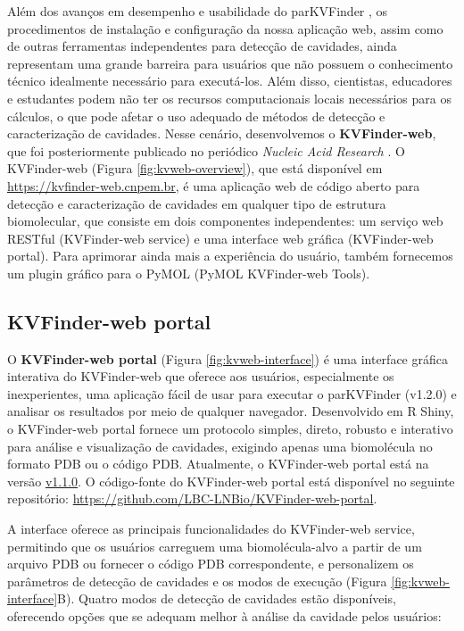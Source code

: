\documentclass[Portugues]{phdquali}
\begin{document}
Além dos avanços em desempenho e usabilidade do parKVFinder \cite{guerra2019,guerra2020,guerra2023A}, os procedimentos de instalação e configuração da nossa aplicação web, assim como de outras ferramentas independentes para detecção de cavidades, ainda representam uma grande barreira para usuários que não possuem o conhecimento técnico idealmente necessário para executá-los. Além disso, cientistas, educadores e estudantes podem não ter os recursos computacionais locais necessários para os cálculos, o que pode afetar o uso adequado de métodos de detecção e caracterização de cavidades. Nesse cenário, desenvolvemos o \textbf{KVFinder-web}, que foi posteriormente  publicado no periódico \textit{Nucleic Acid Research} \cite{guerra2023A}. O KVFinder-web (Figura \ref{fig:kvweb-overview}), que está disponível em \url{https://kvfinder-web.cnpem.br}, é uma aplicação web de código aberto para detecção e caracterização de cavidades em qualquer tipo de estrutura biomolecular, que consiste em dois componentes independentes: um serviço web RESTful (KVFinder-web service) e uma interface web gráfica (KVFinder-web portal). Para aprimorar ainda mais a experiência do usuário, também fornecemos um plugin gráfico para o PyMOL (PyMOL KVFinder-web Tools).

\subsection{KVFinder-web portal}

O \textbf{KVFinder-web portal} (Figura \ref{fig:kvweb-interface}) é uma interface gráfica interativa do KVFinder-web que oferece aos usuários, especialmente os inexperientes, uma aplicação fácil de usar para executar o parKVFinder (v1.2.0) e analisar os resultados por meio de qualquer navegador. Desenvolvido em R Shiny, o KVFinder-web portal fornece um protocolo simples, direto, robusto e interativo para análise e visualização de cavidades, exigindo apenas uma biomolécula no formato PDB ou o código PDB. Atualmente, o KVFinder-web portal está na versão \href{https://github.com/LBC-LNBio/KVFinder-web-portal/tree/v1.1.0}{v1.1.0}. O código-fonte do KVFinder-web portal está disponível no seguinte repositório: \url{https://github.com/LBC-LNBio/KVFinder-web-portal}.

A interface oferece as principais funcionalidades do KVFinder-web service, permitindo que os usuários carreguem uma biomolécula-alvo a partir de um arquivo PDB ou fornecer o código PDB correspondente, e personalizem os parâmetros de detecção de cavidades e os modos de execução (Figura \ref{fig:kvweb-interface}B). Quatro modos de detecção de cavidades estão disponíveis, oferecendo opções que se adequam melhor à análise da cavidade pelos usuários:
\end{document}
